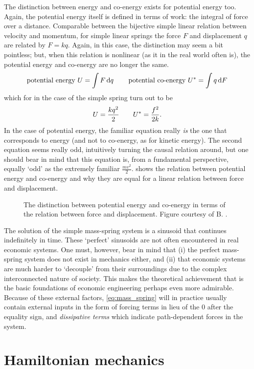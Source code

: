 The distinction between energy and co-energy exists for potential energy too. Again, the potential energy itself is defined in terms of work: the integral of force over a distance. Comparable between the bijective simple linear relation between velocity and momentum, for simple linear springs the force $F$ and displacement $q$ are related by $F = kq$. Again, in this case, the distinction may seem a bit pointless; but, when this relation is nonlinear (as it in the real world often is), the potential energy and co-energy are no longer the same. 
$$ \text{potential energy } U = \int F \dd{q} \qquad \text{potential co-energy } U^* = \int q \dd{F} $$
which for in the case of the simple spring turn out to be
$$ U = \frac{kq^2}{2} \qquad U^* = \frac{f^2}{2k}. $$
In the case of potential energy, the familiar equation really \emph{is} the one that corresponds to energy (and not to co-energy, as for kinetic energy). The second equation seems really odd, intuitively turning the causal relation around, but one should bear in mind that this equation is, from a fundamental perspective, equally `odd' as the extremely familiar $\frac{mv^2}{2}$.  shows the relation between potential energy and co-energy and why they are equal for a linear relation between force and displacement.
\begin{figure}[ht]
    \centering
    
    \caption{The distinction between potential energy and co-energy in terms of the relation between force and displacement. Figure courtesy of B. \citet{Krabbenborg2021}.}
    \label{fig:potential_energy}
\end{figure}
The solution of the simple mass-spring system is a sinusoid that continues indefinitely in time. These `perfect' sinusoids are not often encountered in real economic systems. One must, however, bear in mind that (i) the perfect mass-spring system does not exist in mechanics either, and (ii) that economic systems are much harder to `decouple' from their surroundings due to the complex interconnected nature of society. This makes the theoretical achievement that is the basic foundations of economic engineering perhaps even more admirable. Because of these external factors, \cref{eq:mass_spring} will in practice usually contain external inputs in the form of forcing terms in lieu of the 0 after the equality sign, and \emph{dissipative terms} which indicate path-dependent forces in the system. 

\section{Hamiltonian mechanics}

